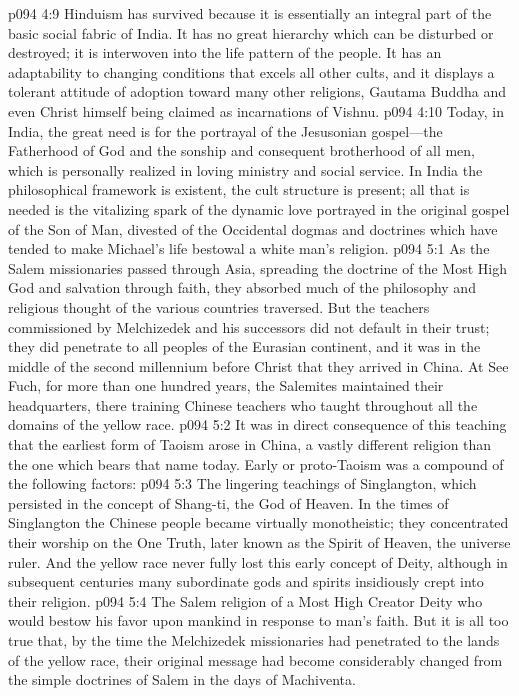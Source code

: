 \vs p094 4:9 Hinduism has survived because it is essentially an integral part of the basic social fabric of India. It has no great hierarchy which can be disturbed or destroyed; it is interwoven into the life pattern of the people. It has an adaptability to changing conditions that excels all other cults, and it displays a tolerant attitude of adoption toward many other religions, Gautama Buddha and even Christ himself being claimed as incarnations of Vishnu.
\vs p094 4:10 Today, in India, the great need is for the portrayal of the Jesusonian gospel---the Fatherhood of God and the sonship and consequent brotherhood of all men, which is personally realized in loving ministry and social service. In India the philosophical framework is existent, the cult structure is present; all that is needed is the vitalizing spark of the dynamic love portrayed in the original gospel of the Son of Man, divested of the Occidental dogmas and doctrines which have tended to make Michael’s life bestowal a white man’s religion.
\vs p094 5:1 As the Salem missionaries passed through Asia, spreading the doctrine of the Most High God and salvation through faith, they absorbed much of the philosophy and religious thought of the various countries traversed. But the teachers commissioned by Melchizedek and his successors did not default in their trust; they did penetrate to all peoples of the Eurasian continent, and it was in the middle of the second millennium before Christ that they arrived in China. At See Fuch, for more than one hundred years, the Salemites maintained their headquarters, there training Chinese teachers who taught throughout all the domains of the yellow race.
\vs p094 5:2 It was in direct consequence of this teaching that the earliest form of Taoism arose in China, a vastly different religion than the one which bears that name today. Early or proto\hyp{}Taoism was a compound of the following factors:
\pc \vs p094 5:3 \bibnobreakspace The lingering teachings of Singlangton, which persisted in the concept of Shang\hyp{}ti, the God of Heaven. In the times of Singlangton the Chinese people became virtually monotheistic; they concentrated their worship on the One Truth, later known as the Spirit of Heaven, the universe ruler. And the yellow race never fully lost this early concept of Deity, although in subsequent centuries many subordinate gods and spirits insidiously crept into their religion.
\pc \vs p094 5:4 \bibnobreakspace The Salem religion of a Most High Creator Deity who would bestow his favor upon mankind in response to man’s faith. But it is all too true that, by the time the Melchizedek missionaries had penetrated to the lands of the yellow race, their original message had become considerably changed from the simple doctrines of Salem in the days of Machiventa.
